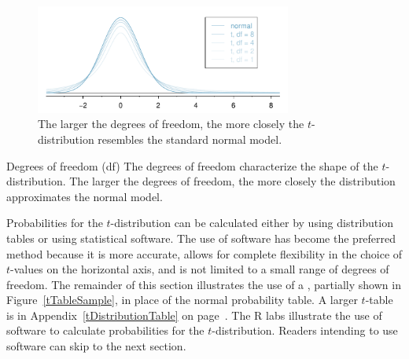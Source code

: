 \textD{\newpage}

\begin{figure}
\centering
\includegraphics[width=0.75\textwidth]{ch_inference_for_means_oi_biostat/figures/tDistConvergeToNormalDist/tDistConvergeToNormalDist}
\caption{The larger the degrees of freedom, the more closely the $t$-distribution resembles the standard normal model.}
\label{tDistConvergeToNormalDist}
\end{figure}

\begin{onebox}{Degrees of freedom (df)}
The degrees of freedom characterize the shape of the $t$-distribution. The larger the degrees of freedom, the more closely the distribution approximates the normal model.
\end{onebox}

Probabilities for the $t$-distribution can be calculated either by using distribution tables or using statistical software. The use of software has become the preferred method because it is more accurate, allows for complete flexibility in the choice of $t$-values on the horizontal axis, and is not limited to a small range of degrees of freedom. The remainder of this section illustrates the use of a , partially shown in Figure~\ref{tTableSample}, in place of the normal probability table. A larger $t$-table is in Appendix~\ref{tDistributionTable} on page~\pageref{tDistributionTable}.  The \textsf{R} labs illustrate the use of software to calculate probabilities for the $t$-distribution.  Readers intending to use software can skip to the next section.


